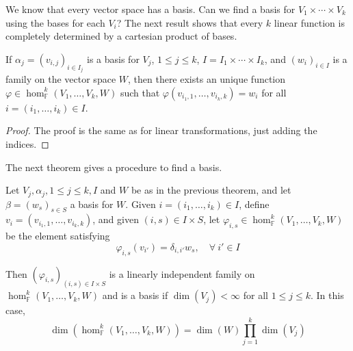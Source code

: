 We know that every vector space has a basis. Can we find a basis for $V_1 \times \cdots \times V_k$ using the bases for each $V_i$? The next result shows that every $k$ linear function is completely determined by a cartesian product of bases.

\begin{theorem}
  If $\alpha_j = (v_{i,j})_{i \in I_j}$ is a basis for $V_j$, $1 \leq j \leq k$, $I = I_1 \times \cdots \times I_k$, and $(w_i)_{i \in I}$ is a family on the vector space $W$, then there exists an unique function $\varphi \in \hom_{\mathbb{F}}^k (V_1, \ldots, V_k, W)$ such that $\varphi(v_{i_1,1}, \ldots, v_{i_k, k}) = w_i$ for all $i = (i_1, \ldots, i_k) \in I$.
\end{theorem}

\begin{proof}
  The proof is the same as for linear transformations, just adding the indices. 
\end{proof}

The next theorem gives a procedure to find a basis. 

\begin{theorem}
  Let $V_j, \alpha_j, 1 \leq j \leq k, I$ and $W$ be as in the previous theorem, and let $\beta = (w_s)_{s \in S}$ a basis for $W$. Given $i = (i_1, \ldots, i_k) \in I$, define $v_i = (v_{i_1, 1}, \ldots, v_{i_k, k})$, and given $(i,s) \in I \times S$, let $\varphi_{i,s} \in \hom_{\mathbb{F}}^k(V_1, \ldots, V_k, W)$ be the element satisfying 
  \[
    \varphi_{i,s}(v_{i'}) = \delta_{i,i'} w_s, \quad \forall~i' \in I
  \]

  Then $(\varphi_{i,s})_{(i,s) \in I \times S}$ is a linearly independent family on $\hom_{\mathbb{F}}^k(V_1, \ldots, V_k, W)$ and is a basis if $\dim(V_j) < \infty$ for all $1 \leq j \leq k$. In this case, 
  \[
    \dim(\hom_{\mathbb{F}}^k(V_1, \ldots, V_k, W)) = \dim(W) \prod_{j=1}^k \dim(V_j)
  \]
\end{theorem}

